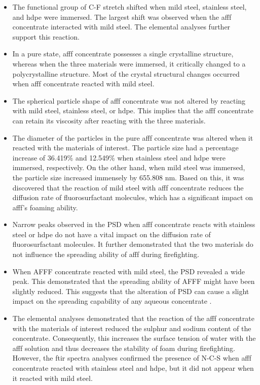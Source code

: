\begin{itemize}
    \item The functional group of C-F stretch shifted when mild steel, stainless steel, and \acrshort{hdpe} were immersed. The largest shift was observed when the \acrshort{afff} concentrate interacted with mild steel. The elemental analyses further support this reaction.
    \item In a pure state, \acrshort{afff} concentrate possesses a single crystalline structure, whereas when the three materials were immersed, it critically changed to a polycrystalline structure. Most of the crystal structural changes occurred when \acrshort{afff} concentrate reacted with mild steel.
    \item The spherical particle shape of \acrshort{afff} concentrate was not altered by reacting with mild steel, stainless steel, or \acrshort{hdpe}. This implies that the \acrshort{afff} concentrate can retain its viscosity after reacting with the three materials.
    \item The diameter of the particles in the pure \acrshort{afff} concentrate was altered when it reacted with the materials of interest. The particle size had a percentage increase of 36.419\% and 12.549\% when stainless steel and \acrshort{hdpe} were immersed, respectively. On the other hand, when mild steel was immersed, the particle size increased immensely by 655.808 nm. Based on this, it was discovered that the reaction of mild steel with \acrshort{afff} concentrate reduces the diffusion rate of fluorosurfactant molecules, which has a significant impact on \acrshort{afff}'s foaming ability. 
    \item Narrow peaks observed in the PSD when \acrshort{afff} concentrate reacts with stainless steel or \acrshort{hdpe} do not have a vital impact on the diffusion rate of fluorosurfactant molecules. It further demonstrated that the two materials do not influence the spreading ability of \acrshort{afff} during firefighting.
    \item When AFFF concentrate reacted with mild steel, the PSD revealed a wide peak. This demonstrated that the spreading ability of AFFF might have been slightly reduced. This suggests that the alteration of PSD can cause a slight impact on the spreading capability of any aqueous concentrate \cite{machhi2021effect}.
    \item The elemental analyses demonstrated that the reaction of the \acrshort{afff} concentrate with the materials of interest reduced the sulphur and sodium content of the concentrate. Consequently, this increases the surface tension of water with the \acrshort{afff} solution and thus decreases the stability of foam during firefighting. However, the \acrshort{ftir} spectra analyses confirmed the presence of N-C-S when \acrshort{afff} concentrate reacted with stainless steel and \acrshort{hdpe}, but it did not appear when it reacted with mild steel.

\end{itemize}
